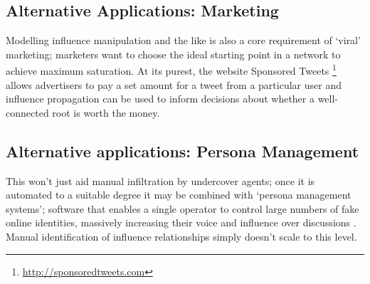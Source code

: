 \subsection{Alternative Applications: Marketing}
Modelling influence manipulation and the like is also a core requirement of
`viral' marketing; marketers want to choose the ideal starting point in a
network to achieve maximum saturation. At its purest, the website
Sponsored Tweets \footnote{\url{http://sponsoredtweets.com}} allows advertisers to pay a set amount for a tweet from a particular user and influence propagation can be used to inform decisions
about whether a well-connected root is worth the money. 

\subsection{Alternative applications: Persona Management}
This won't just aid manual infiltration by undercover agents; once it is
automated to a suitable degree it may be combined with `persona management
systems'; software that enables a single operator to control large numbers of
fake online identities, massively increasing their voice and influence over
discussions \cite{personaPatent}. Manual identification of influence relationships simply doesn't
scale to this level.


% 

